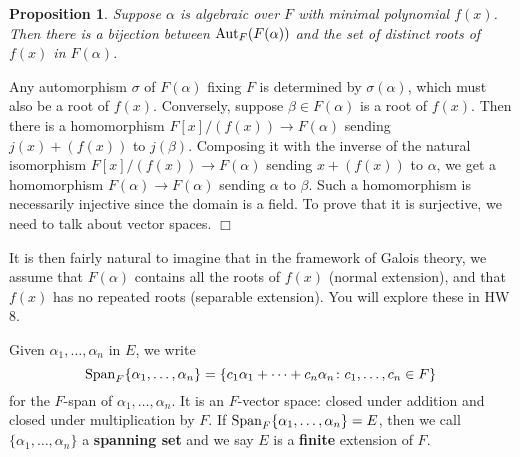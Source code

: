 \documentclass{article}
\def\Aut{{\rm Aut}}
\def\tSpan{{\rm Span}}
\newtheorem{lemma}[subsection]{Lemma}
\newtheorem{proposition}[subsection]{Proposition}
\newenvironment{proof}{\noindent {\bf Proof:}}{$\Box$ \vspace{2 ex}}
\begin{document}
\begin{comment}
    \begin{lemma}
    If $f(x)\in F[x]$ is a monic irreducible polynomial and $\alpha$ is a root of $f(x)$, then $f(x)$ is the minimal polynomial of $\alpha$.
\end{lemma}

\begin{proof}
    The minimal polynomial $g(x)$ of $\alpha$ is a monic irreducible polynomial dividing $f(x)$. Since they are both irreducible, we have $g(x) = f(x)u$ for some $u\in F^\times$. Since they are both monic, we have $u = 1$.
\end{proof}
\end{comment}



\begin{proposition}
    \label{prop:ab}
    Suppose $\alpha$ is algebraic over $F$ with minimal polynomial $f(x)$. Then there is a bijection between $\Aut_F(F(\alpha))$ and the set of distinct roots of $f(x)$ in $F(\alpha)$.
\end{proposition}

\begin{proof}
    Any automorphism $\sigma$ of $F(\alpha)$ fixing $F$ is determined by $\sigma(\alpha)$, which must also be a root of $f(x)$. Conversely, suppose $\beta\in F(\alpha)$ is a root of $f(x)$. Then there is a homomorphism $F[x]/(f(x))\rightarrow F(\alpha)$ sending $j(x)+(f(x))$ to $j(\beta)$. Composing it with the inverse of the natural isomorphism $F[x]/(f(x))\rightarrow F(\alpha)$ sending $x + (f(x))$ to $\alpha$, we get a homomorphism $F(\alpha)\rightarrow F(\alpha)$ sending $\alpha$ to $\beta$. Such a homomorphism is necessarily injective since the domain is a field. To prove that it is surjective, we need to talk about vector spaces.
\end{proof}

It is then fairly natural to imagine that in the framework of Galois theory, we assume that $F(\alpha)$ contains all the roots of $f(x)$ (normal extension), and that $f(x)$ has no repeated roots (separable extension). You will explore these in HW 8.


Given $\alpha_1,\ldots,\alpha_n$ in $E$, we write
$$\tSpan_F\{\alpha_1,\ldots,\alpha_n\} = \{c_1\alpha_1 + \cdots + c_n\alpha_n\colon c_1,\ldots,c_n\in F\}$$
for the $F$-span of $\alpha_1,\ldots,\alpha_n$. It is an $F$-vector space: closed under addition and closed under multiplication by $F$. If $\tSpan_F\{\alpha_1,\ldots,\alpha_n\} = E$, then we call $\{\alpha_1,\ldots,\alpha_n\}$ a \textbf{spanning set} and we say $E$ is a \textbf{finite} extension of $F$. 
\end{document}
